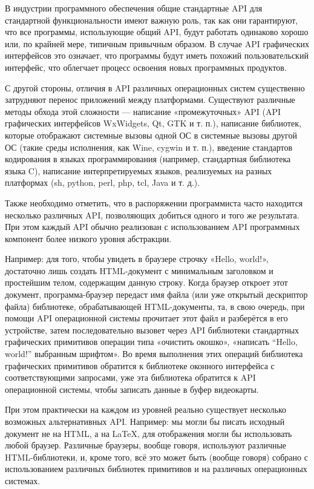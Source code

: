 В индустрии программного обеспечения общие стандартные API для стандартной функциональности имеют важную роль, так как они гарантируют, что все программы, использующие общий API, будут работать одинаково хорошо или, по крайней мере, типичным привычным образом. В случае API графических интерфейсов это означает, что программы будут иметь похожий пользовательский интерфейс, что облегчает процесс освоения новых программных продуктов.

С другой стороны, отличия в API различных операционных систем существенно затрудняют перенос приложений между платформами. Существуют различные методы обхода этой сложности — написание «промежуточных» API (API графических интерфейсов WxWidgets, Qt, GTK и т. п.), написание библиотек, которые отображают системные вызовы одной ОС в системные вызовы другой ОС (такие среды исполнения, как Wine, cygwin и т. п.), введение стандартов кодирования в языках программирования (например, стандартная библиотека языка C), написание интерпретируемых языков, реализуемых на разных платформах (sh, python, perl, php, tcl, Java и т. д.).

Также необходимо отметить, что в распоряжении программиста часто находится несколько различных API, позволяющих добиться одного и того же результата. При этом каждый API обычно реализован с использованием API программных компонент более низкого уровня абстракции.

Например: для того, чтобы увидеть в браузере строчку «Hello, world!», достаточно лишь создать HTML-документ с минимальным заголовком и простейшим телом, содержащим данную строку. Когда браузер откроет этот документ, программа-браузер передаст имя файла (или уже открытый дескриптор файла) библиотеке, обрабатывающей HTML-документы, та, в свою очередь, при помощи API операционной системы прочитает этот файл и разберётся в его устройстве, затем последовательно вызовет через API библиотеки стандартных графических примитивов операции типа «очистить окошко», «написать “Hello, world!” выбранным шрифтом». Во время выполнения этих операций библиотека графических примитивов обратится к библиотеке оконного интерфейса с соответствующими запросами, уже эта библиотека обратится к API операционной системы, чтобы записать данные в буфер видеокарты.

При этом практически на каждом из уровней реально существует несколько возможных альтернативных API. Например: мы могли бы писать исходный документ не на HTML, а на LaTeX, для отображения могли бы использовать любой браузер. Различные браузеры, вообще говоря, используют различные HTML-библиотеки, и, кроме того, всё это может быть (вообще говоря) собрано с использованием различных библиотек примитивов и на различных операционных системах.

